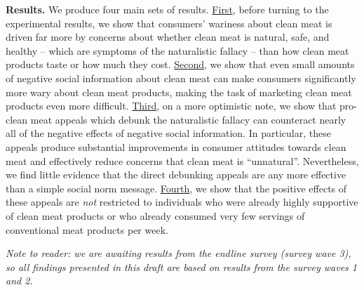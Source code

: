 \documentclass[12pt]{article}
\begin{document}

\textbf{Results.} We produce four main sets of results. \underline{First}, before turning to the experimental results, we show that consumers' wariness about clean meat is driven far more by concerns about whether clean meat is natural, safe, and healthy -- which are symptoms of the naturalistic fallacy -- than how clean meat products taste or how much they cost. \underline{Second}, we show that even small amounts of negative social information about clean meat can make consumers significantly more wary about clean meat products, making the task of marketing clean meat products even more difficult. \underline{Third}, on a more optimistic note, we show that pro-clean meat appeals which debunk the naturalistic fallacy can counteract nearly all of the negative effects of negative social information. In particular, these appeals produce substantial improvements in consumer attitudes towards clean meat and effectively reduce concerns that clean meat is ``unnatural''. Nevertheless, we find little evidence that the direct debunking appeals are any more effective than a simple social norm message. \underline{Fourth}, we show that the positive effects of these appeals are \textit{not} restricted to individuals who were already highly supportive of clean meat products or who already consumed very few servings of conventional meat products per week.

\textit{Note to reader: we are awaiting results from the endline survey (survey wave 3), so all findings presented in this draft are based on results from the survey waves 1 and 2.}


\end{document}
